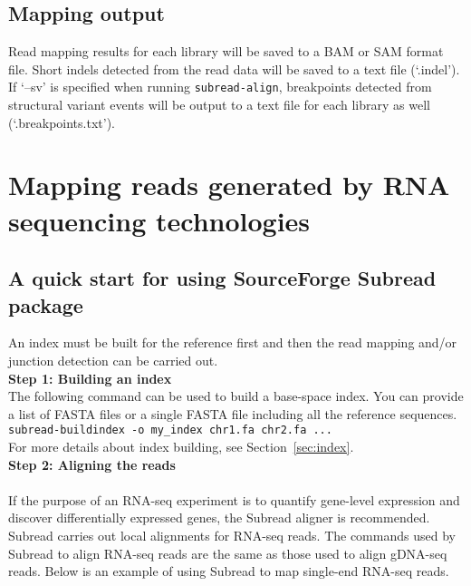 \documentclass[12pt]{report}
\newcommand{\code}[1]{{\small\texttt{#1}}}
\newcommand{\Subread}{\textsf{Subread}}
\begin{document}
\section{Mapping output}

Read mapping results for each library will be saved to a BAM or SAM format file.
Short indels detected from the read data will be saved to a text file (`.indel').
If `--sv' is specified when running \code{subread-align}, breakpoints detected from structural variant events will be output to a text file for each library as well (`.breakpoints.txt').

\newpage



\chapter{Mapping reads generated by RNA sequencing technologies}

\section{A quick start for using SourceForge {\Subread} package}

\label{sec:rnaseq-subread}
An index must be built for the reference first and then the read mapping and/or junction detection can be carried out.\\

{\noindent\bf Step 1: Building an index}\\

\noindent The following command can be used to build a base-space index.
You can provide a list of FASTA files or a single FASTA file including all the reference sequences.\\

\code{subread-buildindex -o my\_index chr1.fa chr2.fa ...}\\

\noindent For more details about index building, see Section~\ref{sec:index}.\\

{\noindent\bf Step 2: Aligning the reads}\\

\noindent{{\Subread}}\\

\noindent If the purpose of an RNA-seq experiment is to quantify gene-level expression and discover differentially expressed genes, the {\Subread} aligner is recommended.
{\Subread} carries out local alignments for RNA-seq reads.
The commands used by {\Subread} to align RNA-seq reads are the same as those used to align gDNA-seq reads.
Below is an example of using {\Subread} to map single-end RNA-seq reads.\\
\end{document}
